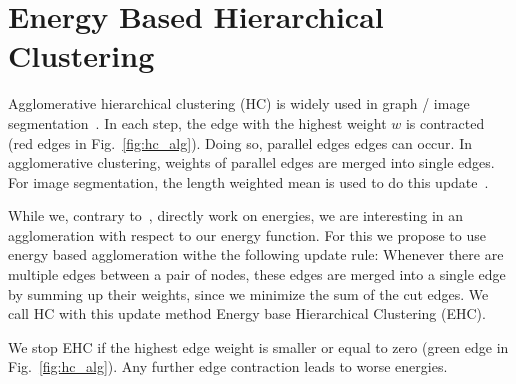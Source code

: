 \documentclass[10pt,twocolumn,letterpaper]{article}
\begin{document}

%
%


\section{Energy Based Hierarchical Clustering}\label{sec:ehc}
Agglomerative hierarchical clustering (HC) is widely used
in graph / image segmentation~\cite{arbelaez_2006}.
In each step, the edge with the highest weight $w$ is
contracted (red edges in Fig.~\ref{fig:hc_alg}).
Doing so, parallel edges edges can occur.
In agglomerative clustering, weights of
parallel edges are merged into single edges.
For image segmentation, the length
weighted mean is used to do this update~\cite{arbelaez_2006}.

While we, contrary to~\cite{arbelaez_2006}, directly work on energies, we are interesting in an 
agglomeration with respect to our energy function.
For this we propose to use energy based agglomeration
withe the following update rule:
Whenever there are multiple edges between 
a pair of nodes, these edges are merged into a single edge
by summing up their weights, since we 
minimize the sum of the cut edges.
We call HC with this update method Energy base Hierarchical Clustering (EHC).

We stop EHC if the highest edge weight is
smaller or equal to zero  (green edge in Fig.~\ref{fig:hc_alg}). Any further edge
contraction leads to worse energies.




\end{document}
